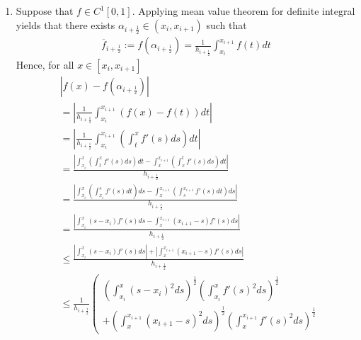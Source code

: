 \documentclass[a4paper]{article}
\numberwithin{equation}{section}
\begin{document}
\begin{enumerate}
\item Suppose that $f\in C^1\left[0,1\right]$. Applying mean value theorem for definite integral yields that there exists $\alpha _{i+\frac{1}{2}} \in \left(x_i,x_{i+1}\right)$ such that
\begin{align}
\overline{f}_{i+\frac{1}{2}}:=f\left( {{\alpha _{i + \frac{1}{2}}}} \right) = \frac{1}{{{h_{i + \frac{1}{2}}}}}\int_{{x_i}}^{{x_{i + 1}}} {f\left( t \right)dt} 
\end{align}
Hence, for all $x \in \left[ {{x_i},{x_{i + 1}}} \right]$
\begin{align}
&\left| {f\left( x \right) - f\left( {{\alpha _{i + \frac{1}{2}}}} \right)} \right| \\
&= \left| {\frac{1}{{{h_{i + \frac{1}{2}}}}}\int_{{x_i}}^{{x_{i + 1}}} {\left( {f\left( x \right) - f\left( t \right)} \right)dt} } \right|\\
& = \left| {\frac{1}{{{h_{i + \frac{1}{2}}}}}\int_{{x_i}}^{{x_{i + 1}}} {\left( {\int_t^x {f'\left( s \right)ds} } \right)dt} } \right|\\
 &= \frac{{\left| {\int_{{x_i}}^x {\left( {\int_t^x {f'\left( s \right)ds} } \right)dt}  - \int_x^{{x_{i + 1}}} {\left( {\int_x^t {f'\left( s \right)ds} } \right)dt} } \right|}}{{{h_{i + \frac{1}{2}}}}}\\
& = \frac{{\left| {\int_{{x_i}}^x {\left( {\int_{{x_i}}^s {f'\left( s \right)dt} } \right)ds}  - \int_x^{{x_{i + 1}}} {\left( {\int_s^{{x_{i + 1}}} {f'\left( s \right)dt} } \right)ds} } \right|}}{{{h_{i + \frac{1}{2}}}}}\\
 &= \frac{{\left| {\int_{{x_i}}^x {\left( {s - {x_i}} \right)f'\left( s \right)ds}  - \int_x^{{x_{i + 1}}} {\left( {{x_{i + 1}} - s} \right)f'\left( s \right)ds} } \right|}}{{{h_{i + \frac{1}{2}}}}}\\
 &\le \frac{{\left| {\int_{{x_i}}^x {\left( {s - {x_i}} \right)f'\left( s \right)ds} } \right| + \left| {\int_x^{{x_{i + 1}}} {\left( {{x_{i + 1}} - s} \right)f'\left( s \right)ds} } \right|}}{{{h_{i + \frac{1}{2}}}}}\\
&\le \frac{1}{{{h_{i + \frac{1}{2}}}}}\left( \begin{array}{l}
{\left( {\int_{{x_i}}^x {{{\left( {s - {x_i}} \right)}^2}ds} } \right)^{\frac{1}{2}}}{\left( {\int_{{x_i}}^x {f'{{\left( s \right)}^2}ds} } \right)^{\frac{1}{2}}}\\
 + {\left( {\int_x^{{x_{i + 1}}} {{{\left( {{x_{i + 1}} - s} \right)}^2}ds} } \right)^{\frac{1}{2}}}{\left( {\int_x^{{x_{i + 1}}} {f'{{\left( s \right)}^2}ds} } \right)^{\frac{1}{2}}}

\end{array}
\end{align}
\end{enumerate}
\end{document}
